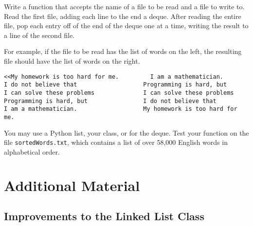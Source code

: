 \begin{problem} %
Write a function that accepts the name of a file to be read and a file to write to.
Read the first file, adding each line to the end a deque.
After reading the entire file, pop each entry off of the end of the deque one at a time, writing the result to a line of the second file.

For example, if the file to be read has the list of words on the left, the resulting file should have the list of words on the right.

\begin{lstlisting}
<<My homework is too hard for me.         I am a mathematician.
I do not believe that                   Programming is hard, but
I can solve these problems              I can solve these problems
Programming is hard, but                I do not believe that
I am a mathematician.                   My homework is too hard for me.
\end{lstlisting}

You may use a Python list, your  class, or  for the deque.
Test your function on the file \texttt{sortedWords.txt}, which contains a list of over 58,000 English words in alphabetical order.
\end{problem}

\newpage

\section*{Additional Material} %

\subsection*{Improvements to the Linked List Class} %

